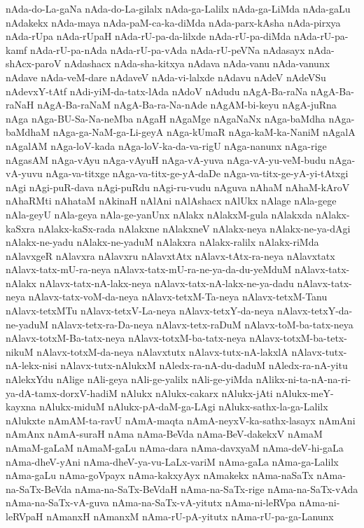 {nAda-do-La-gaNa
nAda-do-La-gilalx
nAda-ga-Lalilx
nAda-ga-LiMda
nAda-gaLu
nAdakekx
nAda-maya
nAda-paM-ca-ka-diMda
nAda-parx-kAsha
nAda-pirxya
nAda-rUpa
nAda-rUpaH
nAda-rU-pa-da-lilxde
nAda-rU-pa-diMda
nAda-rU-pa-kamf
nAda-rU-pa-nAda
nAda-rU-pa-vAda
nAda-rU-peVNa
nAdasayx
nAda-shAcx-paroV
nAdashacx
nAda-sha-kitxya
nAdava
nAda-vanu
nAda-vanunx
nAdave
nAda-veM-dare
nAdaveV
nAda-vi-lalxde
nAdavu
nAdeV
nAdeVSu
nAdevxY-tAtf
nAdi-yiM-da-tatx-lAda
nAdoV
nAdudu
nAgA-Ba-raNa
nAgA-Ba-raNaH
nAgA-Ba-raNaM
nAgA-Ba-ra-Na-nAde
nAgAM-bi-keyu
nAgA-juRna
nAga
nAga-BU-Sa-Na-neMba
nAgaH
nAgaMge
nAgaNaNx
nAga-baMdha
nAga-baMdhaM
nAga-ga-NaM-ga-Li-geyA
nAga-kUmaR
nAga-kaM-ka-NaniM
nAgalA
nAgalAM
nAga-loV-kada
nAga-loV-ka-da-va-rigU
nAga-nanunx
nAga-rige
nAgasAM
nAga-vAyu
nAga-vAyuH
nAga-vA-yuva
nAga-vA-yu-veM-budu
nAga-vA-yuvu
nAga-va-titxge
nAga-va-titx-ge-yA-daDe
nAga-va-titx-ge-yA-yi-tAtxgi
nAgi
nAgi-puR-dava
nAgi-puRdu
nAgi-ru-vudu
nAguva
nAhaM
nAhaM-kAroV
nAhaRMti
nAhataM
nAkinaH
nAlAni
nAlAshacx
nAlUkx
nAlage
nAla-gege
nAla-geyU
nAla-geya
nAla-ge-yanUnx
nAlakx
nAlakxM-gula
nAlakxda
nAlakx-kaSxra
nAlakx-kaSx-rada
nAlakxne
nAlakxneV
nAlakx-neya
nAlakx-ne-ya-dAgi
nAlakx-ne-yadu
nAlakx-ne-yaduM
nAlakxra
nAlakx-ralilx
nAlakx-riMda
nAlavxgeR
nAlavxra
nAlavxru
nAlavxtAtx
nAlavx-tAtx-ra-neya
nAlavxtatx
nAlavx-tatx-mU-ra-neya
nAlavx-tatx-mU-ra-ne-ya-da-du-yeMduM
nAlavx-tatx-nAlakx
nAlavx-tatx-nA-lakx-neya
nAlavx-tatx-nA-lakx-ne-ya-dadu
nAlavx-tatx-neya
nAlavx-tatx-voM-da-neya
nAlavx-tetxM-Ta-neya
nAlavx-tetxM-Tanu
nAlavx-tetxMTu
nAlavx-tetxV-La-neya
nAlavx-tetxY-da-neya
nAlavx-tetxY-da-ne-yaduM
nAlavx-tetx-ra-Da-neya
nAlavx-tetx-raDuM
nAlavx-toM-ba-tatx-neya
nAlavx-totxM-Ba-tatx-neya
nAlavx-totxM-ba-tatx-neya
nAlavx-totxM-ba-tetx-nikuM
nAlavx-totxM-da-neya
nAlavxtutx
nAlavx-tutx-nA-lakxlA
nAlavx-tutx-nA-lekx-nisi
nAlavx-tutx-nAlukxM
nAledx-ra-nA-du-daduM
nAledx-ra-nA-yitu
nAlekxYdu
nAlige
nAli-geya
nAli-ge-yalilx
nAli-ge-yiMda
nAlikx-ni-ta-nA-na-ri-ya-dA-tamx-dorxV-hadiM
nAlukx
nAlukx-cakarx
nAlukx-jAti
nAlukx-meY-kayxna
nAlukx-miduM
nAlukx-pA-daM-ga-LAgi
nAlukx-sathx-la-ga-Lalilx
nAlukxte
nAmAM-ta-ravU
nAmA-maqta
nAmA-neyxV-ka-sathx-lasayx
nAmAni
nAmAnx
nAmA-suraH
nAma
nAma-BeVda
nAma-BeV-dakekxV
nAmaM
nAmaM-gaLaM
nAmaM-gaLu
nAma-dara
nAma-davxyaM
nAma-deV-hi-gaLa
nAma-dheV-yAni
nAma-dheV-ya-vu-LaLx-variM
nAma-gaLa
nAma-ga-Lalilx
nAma-gaLu
nAma-goVpayx
nAma-kakxyAyx
nAmakekx
nAma-naSaTx
nAma-na-SaTx-BeVda
nAma-na-SaTx-BeVdaH
nAma-na-SaTx-rige
nAma-na-SaTx-vAda
nAma-na-SaTx-vA-guva
nAma-na-SaTx-vA-yitutx
nAma-ni-leRVpa
nAma-ni-leRVpaH
nAmanxH
nAmanxM
nAma-rU-pA-yitutx
nAma-rU-pa-ga-Lanunx
}
